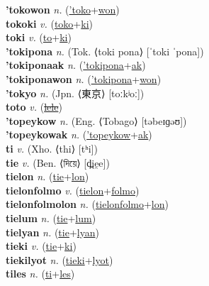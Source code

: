 \textbf{'tokowon} \textit{n.} (\hyperref['toko]{'toko}+\hyperref[won]{won})
 \label{'tokowon} \\
\textbf{tokoki} \textit{v.} (\hyperref[toko]{toko}+\hyperref[ki]{ki})
 \label{tokoki} \\
\textbf{toki} \textit{v.} (\hyperref[to]{to}+\hyperref[ki]{ki})
 \label{toki} \\
\textbf{'tokipona} \textit{n.} (Tok. ⟨toki pona⟩ [ˈtoki ˈpona])
 \label{'tokipona} \\
\textbf{'tokiponaak} \textit{n.} (\hyperref['tokipona]{'tokipona}+\hyperref[ak]{ak})
 \label{'tokiponaak} \\
\textbf{'tokiponawon} \textit{n.} (\hyperref['tokipona]{'tokipona}+\hyperref[won]{won})
 \label{'tokiponawon} \\
\textbf{'tokyo} \textit{n.} (Jpn. ⟨東京⟩ [toːkʲoː])
 \label{'tokyo} \\
\textbf{toto} \textit{v.} (\hyperref[lele]{\sout{lele}})
 \label{toto} \\
\textbf{'topeykow} \textit{n.} (Eng. ⟨Tobago⟩ [təbeɪɡəʊ])
 \label{'topeykow} \\
\textbf{'topeykowak} \textit{n.} (\hyperref['topeykow]{'topeykow}+\hyperref[ak]{ak})
 \label{'topeykowak} \\
\textbf{ti} \textit{v.} (Xho. ⟨thi⟩ [tʰi])
 \label{ti} \\
\textbf{tie} \textit{v.} (Ben. ⟨দিয়ে⟩ [d̪ie̯e])
 \label{tie} \\
\textbf{tielon} \textit{n.} (\hyperref[tie]{tie}+\hyperref[lon]{lon})
 \label{tielon} \\
\textbf{tielonfolmo} \textit{v.} (\hyperref[tielon]{tielon}+\hyperref[folmo]{folmo})
 \label{tielonfolmo} \\
\textbf{tielonfolmolon} \textit{n.} (\hyperref[tielonfolmo]{tielonfolmo}+\hyperref[lon]{lon})
 \label{tielonfolmolon} \\
\textbf{tielum} \textit{n.} (\hyperref[tie]{tie}+\hyperref[lum]{lum})
 \label{tielum} \\
\textbf{tielyan} \textit{n.} (\hyperref[tie]{tie}+\hyperref[lyan]{lyan})
 \label{tielyan} \\
\textbf{tieki} \textit{v.} (\hyperref[tie]{tie}+\hyperref[ki]{ki})
 \label{tieki} \\
\textbf{tiekilyot} \textit{n.} (\hyperref[tieki]{tieki}+\hyperref[lyot]{lyot})
 \label{tiekilyot} \\
\textbf{tiles} \textit{n.} (\hyperref[ti]{ti}+\hyperref[les]{les})
 \label{tiles} \\
